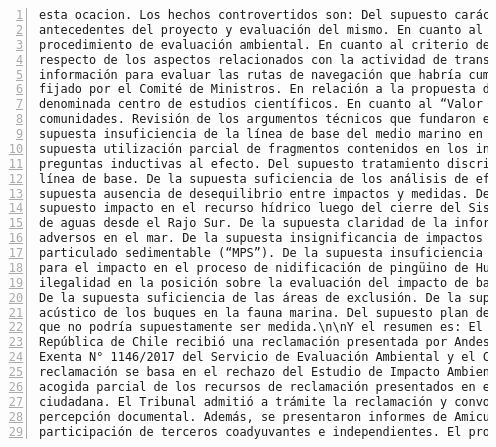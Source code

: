\begin{Verbatim}[frame=lines, label=Elavoración propia -  Ejemplo de Contexto enviado por el Chatbot a OpenAI
				, fontsize=\footnotesize, numbers=left
				, baselinestretch=0.4
				, formatcom=\color{gray}]
esta ocacion. Los hechos controvertidos son: Del supuesto carácter completo de los
antecedentes del proyecto y evaluación del mismo. En cuanto al término anticipado del
procedimiento de evaluación ambiental. En cuanto al criterio del propio Comité de Ministros
respecto de los aspectos relacionados con la actividad de transporte marítimo. De la supuesta
información para evaluar las rutas de navegación que habría cumplido con creces el estándar
fijado por el Comité de Ministros. En relación a la propuesta de la casa del Mar, luego
denominada centro de estudios científicos. En cuanto al “Valor Compartido” con las
comunidades. Revisión de los argumentos técnicos que fundaron el rechazo del proyecto. De la
supuesta insuficiencia de la línea de base del medio marino en las rutas de navegación. De la
supuesta utilización parcial de fragmentos contenidos en los informes de los Servicios, con
preguntas inductivas al efecto. Del supuesto tratamiento discriminatorio en lo relativo a la
línea de base. De la supuesta suficiencia de los análisis de efectos sinérgicos. De la
supuesta ausencia de desequilibrio entre impactos y medidas. De las Reclamaciones PAC. Del
supuesto impacto en el recurso hídrico luego del cierre del Sistema de Captación y Devolución
de aguas desde el Rajo Sur. De la supuesta claridad de la información para descartar impactos
adversos en el mar. De la supuesta insignificancia de impactos por aporte de material
particulado sedimentable (“MPS”). De la supuesta insuficiencia de la medida de compensación
para el impacto en el proceso de nidificación de pingüino de Humboldt. De la supuesta
ilegalidad en la posición sobre la evaluación del impacto de barreras eólicas en la avifauna.
De la supuesta suficiencia de las áreas de exclusión. De la supuesta evaluación del impacto
acústico de los buques en la fauna marina. Del supuesto plan de monitoreo de aves y cetáceos
que no podría supuestamente ser medida.\n\nY el resumen es: El Primer Tribunal Ambiental de la
República de Chile recibió una reclamación presentada por Andes Iron SpA contra la Resolución
Exenta N° 1146/2017 del Servicio de Evaluación Ambiental y el Comité de Ministros. La
reclamación se basa en el rechazo del Estudio de Impacto Ambiental del proyecto Dominga y la
acogida parcial de los recursos de reclamación presentados en el marco de la participación
ciudadana. El Tribunal admitió a trámite la reclamación y convocó a una audiencia de
percepción documental. Además, se presentaron informes de Amicus Curiae y se aceptó la
participación de terceros coadyuvantes e independientes. El proceso judicial continúa y se

\end{Verbatim}
